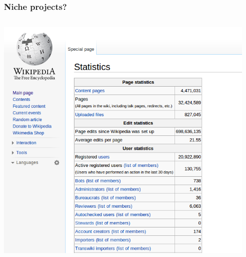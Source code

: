\documentclass{beamer}
\begin{document}
\begin{frame}
  \frametitle{Niche projects?}
  \begin{columns}
    \begin{column}{0.5\textwidth}
      \includegraphics[height = 0.8\textheight, width = \textwidth, keepaspectratio = true]{figure/wiki_stats}
    \end{column}
    \begin{column}{0.5\textwidth}

\end{column}
\end{columns}
\end{frame}
\end{document}
